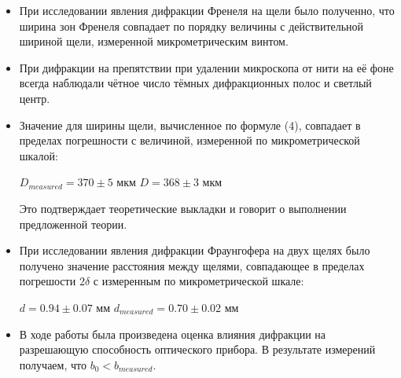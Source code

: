 \documentclass{article}
\begin{document}
\begin{itemize}
    \item При исследовании явления дифракции Френеля на щели было полученно, что ширина зон Френеля совпадает по порядку величины с действительной шириной щели, измеренной микрометрическим винтом. 

\item При дифракции на препятствии при удалении микроскопа от нити на её фоне всегда наблюдали чётное число тёмных дифракционных полос и светлый центр.

    \item Значение для ширины щели, вычисленное по формуле (4), совпадает в пределах погрешности с величиной, измеренной по микрометрической шкалой:
 \begin{center}
        $D_{measured} = 370\pm5$ мкм \hspace{1cm} $D = 368\pm3$ мкм
    \end{center}
Это подтверждает теоретические выкладки и говорит о выполнении предложенной теории.
    
    \item При исследовании явления дифракции Фраунгофера на двух щелях было получено значение расстояния между щелями, совпадающее в пределах погрешости $2\delta$ с измеренным по микрометрической шкале:
     
    \begin{center}
        $d = 0.94\pm 0.07 \text{ мм} $ \hspace{1cm} $ d_{measured} = 0.70\pm 0.02\text{ мм} $
    \end{center}

\item В ходе работы была произведена оценка влияния дифракции на разрешающую способность оптического прибора. В результате измерений получаем, что $b_0 < b_{measured}$.

\end{itemize}
\end{document}
